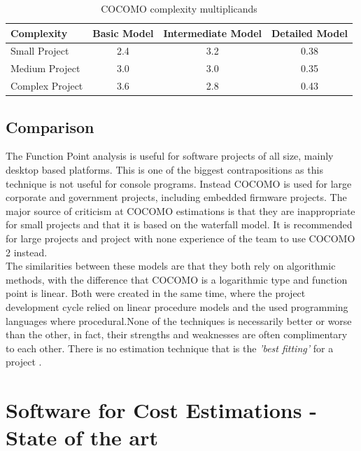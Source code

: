 \begin{table}[h]
	\centering 
	\setlength{\tabcolsep}{4pt}
	\begin{tabular}{|l|c|c|c|}\hline
		Complexity	&  Basic Model 		&  Intermediate Model	&  Detailed Model\\ \hline
		Small Project   	& 2.4      	& 3.2  					& 0.38	\\ \hline
		Medium Project 		& 3.0      	& 3.0  					& 0.35	\\ \hline
		Complex Project 	& 3.6 		& 2.8					& 0.43\\ \hline
	\end{tabular} 
	\caption{COCOMO complexity multiplicands} 
	\label{cocomo:complexity} 
\end{table}

\subsection{Comparison}

The Function Point analysis is useful for software projects of all size, mainly desktop based platforms. This is one of the biggest contrapositions as this technique is not useful for console programs. Instead COCOMO is used for large corporate and government projects, including embedded firmware projects. The major source of criticism at COCOMO estimations is that they are inappropriate for small projects and that it is based on the waterfall model. It is recommended for large projects and project with none experience of the team to use COCOMO 2 instead.\\
The similarities between these models are that they both rely on algorithmic methods, with the difference that COCOMO is a logarithmic type and function point is linear. Both were created in the same time, where the project development cycle relied on linear procedure models and the used programming languages where procedural.None of the techniques is necessarily better or worse than the other, in fact, their strengths and weaknesses are often complimentary to each other. There is no estimation technique that is the \textit{'best fitting'} for a project \cite{estimationanalysis}.

\section{Software for Cost Estimations - State of the art}
\label{sec:stateofart}

